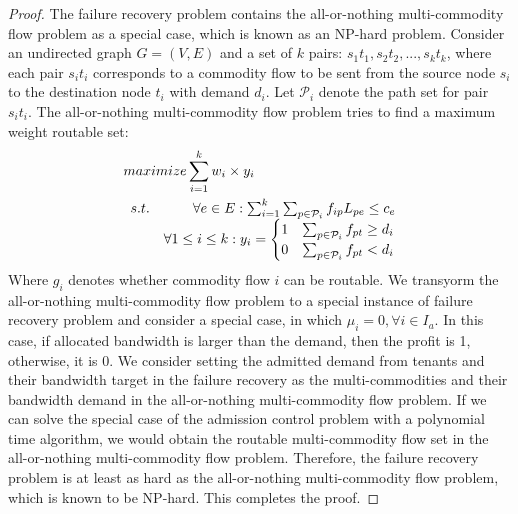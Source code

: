 \documentclass[sigconf]{acmart}
\begin{document}
\begin{appendices}
 
\begin{proof}
The failure recovery problem contains the all-or-nothing multi-commodity flow problem as a special case, which is known as an NP-hard problem\cite{inproceedings2}.
Consider an undirected graph $G = (V,E)$ and a set of $k$ pairs: $s_1t_1, s_2t_2,..., s_kt_k$,
where each pair $s_it_i$ corresponds to a commodity flow to be sent from the source node $s_i$ to the destination node $t_i$ with demand $d_i$.
Let $\mathcal{P}_i$ denote the path set for pair $s_it_i$.
The  all-or-nothing multi-commodity flow problem tries to find a maximum weight routable set:
\begin{equation}
\begin{aligned} \label{P}
&maximize  \sum_{i=1}^k w_i \times y_i\\
&\begin{array}{r@{\quad}r@{}l@{\quad}l}
s.t. &\forall e \in E: \sum_{i=1}^k\sum_{p\in \mathcal{P}_i}f_{ip}L_{pe} \le c_e \\
     &\forall  1\le i \le k  : y_i=
\begin{cases}
1 &\text{$\sum_{p \in \mathcal{P}_i}f_{pt} \ge d_i$}\\
0 &\text{$\sum_{p\in \mathcal{P}_i}f_{pt} < d_i$}
\end{cases}\\
\end{array}
\end{aligned}
\end{equation}
Where $g_i$ denotes whether commodity flow $i$ can be routable.
We transyorm the all-or-nothing multi-commodity flow problem to a special instance of
failure recovery problem and consider a special case, in which $\mu_i=0,\forall i \in I_a$.
In this case, if allocated bandwidth is larger than the demand, then the profit is 1, otherwise, it is 0.
We consider setting the admitted demand from tenants and their bandwidth target in 
the failure recovery as the multi-commodities and their bandwidth demand in the all-or-nothing multi-commodity flow problem.
If we can solve the special case of the admission control problem with a polynomial time algorithm, we would obtain the routable multi-commodity flow set  in the all-or-nothing multi-commodity flow problem.  
Therefore, the failure recovery problem  is at least as hard as the all-or-nothing multi-commodity flow
problem, which is known to be NP-hard. This completes the
proof.
\end{proof}

 \end{appendices}
\end{document}
